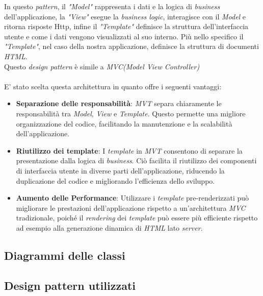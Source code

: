 \documentclass[5pt]{article}
\begin{document}
In questo \textit{pattern}, il \textit{"Model"} rappresenta i dati e la logica di \textit{business} dell'applicazione, la \textit{"View"} esegue la \textit{business logic}, interagisce con il \textit{Model} e ritorna risposte Http, infine  il \textit{"Template"} definisce la struttura dell'interfaccia utente e come i dati vengono visualizzati al suo interno. Più nello specifico il \textit{"Template"}, nel caso della nostra applicazione, definisce la struttura di documenti \textit{HTML}.\\

Questo \textit{design pattern} è simile a \textit{MVC(Model View Controller)} \\\\
E' stato scelta questa architettura in quanto offre i seguenti vantaggi:
\begin{itemize}
    \item \textbf{Separazione delle responsabilità}: \textit{MVT} separa chiaramente le responsabilità tra \textit{Model}, \textit{View} e \textit{Template}. Questo permette una migliore organizzazione del codice, facilitando la manutenzione e la scalabilità dell'applicazione.

    \item \textbf{Riutilizzo dei template}: I \textit{template} in \textit{MVT} consentono di separare la presentazione dalla logica di \textit{business}. Ciò facilita il riutilizzo dei componenti di interfaccia utente in diverse parti dell'applicazione, riducendo la duplicazione del codice e migliorando l'efficienza dello sviluppo.

    \item \textbf{Aumento delle Performance}: Utilizzare i \textit{template} pre-renderizzati può migliorare le prestazioni dell'applicazione rispetto a un'architettura \textit{MVC} tradizionale, poiché il \textit{rendering} dei \textit{template} può essere più efficiente rispetto ad esempio alla generazione dinamica di \textit{HTML} lato \textit{server}.

\end{itemize}
	
	\subsection{Diagrammi delle classi}
	
	\subsection{Design pattern utilizzati}
\end{document}
